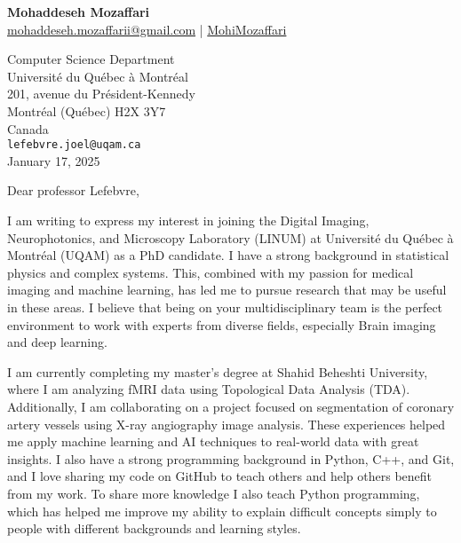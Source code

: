 \documentclass[letterpaper,11pt]{letter}
\begin{document}
\begin{center}
    \textbf{\Huge Mohaddeseh Mozaffari} \\
    \small{\href{mailto:mohaddeseh.mozaffarii@gmail.com}{ mohaddeseh.mozaffarii@gmail.com} | 	\href{https://www.linkedin.com/in/MohiMozaffari/}{ MohiMozaffari}}
\end{center}

\vspace{1em}

\begin{flushleft}
    Computer Science Department\\
Université du Québec à Montréal\\
201, avenue du Président-Kennedy\\
Montréal (Québec) H2X 3Y7\\
Canada\\
    \texttt{lefebvre.joel@uqam.ca} \\
    January 17, 2025
\end{flushleft}

\vspace{1em}

\begin{flushleft}
    Dear professor Lefebvre,
\end{flushleft}

\vspace{1em}

I am writing to express my interest in joining the Digital Imaging, Neurophotonics, and Microscopy Laboratory (LINUM) at Université du Québec à Montréal (UQAM) as a PhD candidate. I have a strong background in statistical physics and complex systems. This, combined with my passion for medical imaging and machine learning, has led me to pursue research that may be useful in these areas. I believe that being on your multidisciplinary team is the perfect environment to work with experts from diverse fields, especially Brain imaging and deep learning.


I am currently completing my master's degree at Shahid Beheshti University, where I am analyzing fMRI data using Topological Data Analysis (TDA). Additionally, I am collaborating on a project focused on segmentation of coronary artery vessels using X-ray angiography image analysis. These experiences helped me apply machine learning and AI techniques to real-world data with great insights. I also have a strong programming background in Python, C++, and Git, and I love sharing my code on GitHub to teach others and help others benefit from my work. To share more knowledge I also teach Python programming, which has helped me improve my ability to explain difficult concepts simply to people with different backgrounds and learning styles.
\end{document}
